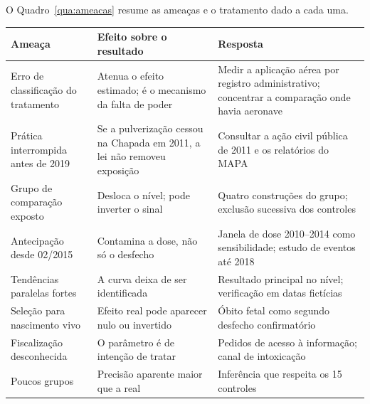 O Quadro~\ref{qua:ameacas} resume as ameaças e o tratamento dado a cada uma.

\begin{quadro}[htb]
\centering
\caption{Ameaças à identificação e resposta do desenho}
\label{qua:ameacas}
\small
\begin{tabular}{|p{3.6cm}|p{4.9cm}|p{5.6cm}|}
\hline
\textbf{Ameaça} & \textbf{Efeito sobre o resultado} & \textbf{Resposta} \\
\hline
Erro de classificação do tratamento
  & Atenua o efeito estimado; é o mecanismo da falta de poder
  & Medir a aplicação aérea por registro administrativo; concentrar a
    comparação onde havia aeronave \\
\hline
Prática interrompida antes de 2019
  & Se a pulverização cessou na Chapada em 2011, a lei não removeu exposição
  & Consultar a ação civil pública de 2011 e os relatórios do MAPA \\
\hline
Grupo de comparação exposto
  & Desloca o nível; pode inverter o sinal
  & Quatro construções do grupo; exclusão sucessiva dos controles \\
\hline
Antecipação desde 02/2015
  & Contamina a dose, não só o desfecho
  & Janela de dose 2010--2014 como sensibilidade; estudo de eventos até 2018 \\
\hline
Tendências paralelas fortes
  & A curva deixa de ser identificada
  & Resultado principal no nível; verificação em datas fictícias \\
\hline
Seleção para nascimento vivo
  & Efeito real pode aparecer nulo ou invertido
  & Óbito fetal como segundo desfecho confirmatório \\
\hline
Fiscalização desconhecida
  & O parâmetro é de intenção de tratar
  & Pedidos de acesso à informação; canal de intoxicação \\
\hline
Poucos grupos
  & Precisão aparente maior que a real
  & Inferência que respeita os 15 controles \\
\hline
\end{tabular}
\end{quadro}
